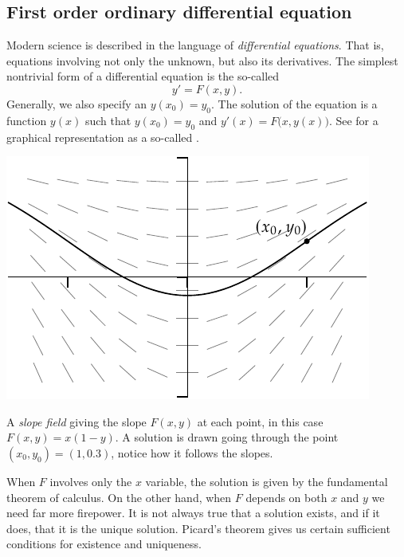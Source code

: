 \subsection{First order ordinary differential equation}

Modern science is described in the language of
\emph{differential equations}.
That is, equations involving not only the unknown, but also its
derivatives.  The simplest nontrivial form of a differential equation is
the so-called \emph{}
\begin{equation*}
y' = F(x,y) .
\end{equation*}
Generally, we also specify an \emph{}
$y(x_0)=y_0$.  The solution of
the equation is a function $y(x)$ such that 
$y(x_0)=y_0$ and $y'(x) = F\bigl(x,y(x)\bigr)$.  See
 for a graphical representation as a so-called
\emph{}.
\begin{myfigureht}
\includegraphics{figures/sampleslopes}
\caption{A \emph{slope field} giving the slope $F(x,y)$ at each point,
in this case $F(x,y)=x(1-y)$.  A solution is drawn going through the point
$(x_0,y_0)=(1,0.3)$, notice how it follows the slopes.\label{fig:sampleslopes}}
\end{myfigureht}

When $F$ involves only the $x$ variable, the solution is given by the
fundamental theorem of calculus.  On the other hand, when $F$ depends
on both $x$ and $y$ we need far more firepower.  It is not always
true that a solution exists, and if it does, that it is the unique solution.
Picard's theorem gives us certain sufficient conditions for existence
and uniqueness.

